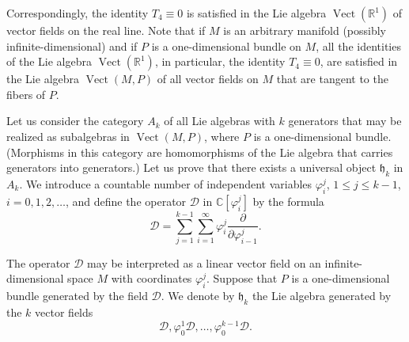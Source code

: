 \documentclass[a4paper]{article}
\newcommand{\C}{\mathbb{C}}
\newcommand{\R}{\mathbb{R}}
\newcommand{\Vect}{\operatorname{Vect}}
\begin{document}
Correspondingly, the identity $T_4 \equiv 0$ is satisfied in the Lie algebra $\Vect(\R^1)$ of vector fields on the real line.
Note that if $M$ is an arbitrary manifold (possibly infinite-dimensional) and if $P$ is a one-dimensional bundle on $M$, all the identities of the Lie algebra $\Vect(\R^1)$, in particular, the identity $T_4 \equiv 0$, are satisfied in the Lie algebra $\Vect(M,P)$ of all vector fields on $M$ that are tangent to the fibers of $P$.

Let us consider the category $A_k$ of all Lie algebras with $k$ generators that may be realized as subalgebras in $\Vect(M,P)$, where $P$ is a one-dimensional bundle.
(Morphisms in this category are homomorphisms of the Lie algebra that carries generators into generators.)
Let us prove that there exists a universal object $\mathfrak{h}_k$ in $A_k$.
We introduce a countable number of independent variables $\varphi_i^j$, $1 \leq j \leq k-1$, $i = 0, 1, 2, \dotsc$, and define the operator $\mathscr{D}$ in $\C[\varphi_i^j]$ by the formula
\begin{equation}
	\label{eq:2}
	\mathscr{D} = \sum_{j=1}^{k-1} \sum_{i=1}^\infty \varphi_i^j \frac{\partial}{\partial \varphi_{i-1}^j}.
\end{equation}

The operator $\mathscr{D}$ may be interpreted as a linear vector field on an infinite-dimensional space $M$ with coordinates $\varphi_i^j$.
Suppose that $P$ is a one-dimensional bundle generated by the field $\mathscr{D}$.
We denote by $\mathfrak{h}_k$ the Lie algebra generated by the $k$ vector fields
\begin{equation*}
	\mathscr{D}, \varphi_0^1 \mathscr{D}, \dotsc, \varphi_0^{k-1} \mathscr{D}.
\end{equation*}
\end{document}
